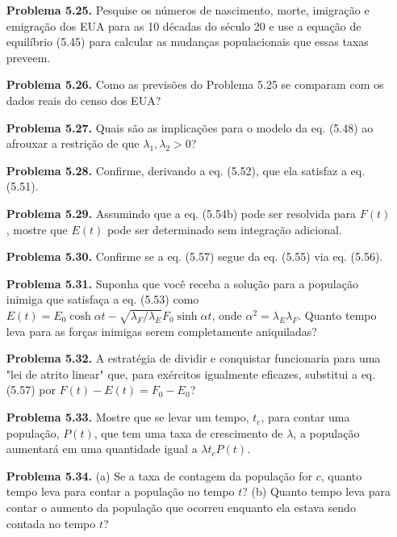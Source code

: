 \begin{enumerate}
    \item[\textbf{Problema 5.25.}] Pesquise os números de nascimento, morte, imigração e emigração dos EUA para as 10 décadas do século 20 e use a equação de equilíbrio (5.45) para calcular as mudanças populacionais que essas taxas preveem.

    \item[\textbf{Problema 5.26.}] Como as previsões do Problema 5.25 se comparam com os dados reais do censo dos EUA?

    \item[\textbf{Problema 5.27.}] Quais são as implicações para o modelo da eq. (5.48) ao afrouxar a restrição de que $\lambda_1, \lambda_2 > 0$?

    \item[\textbf{Problema 5.28.}] Confirme, derivando a eq. (5.52), que ela satisfaz a eq. (5.51).

    \item[\textbf{Problema 5.29.}] Assumindo que a eq. (5.54b) pode ser resolvida para $F(t)$, mostre que $E(t)$ pode ser determinado sem integração adicional.

    \item[\textbf{Problema 5.30.}] Confirme se a eq. (5.57) segue da eq. (5.55) via eq. (5.56).

    \item[\textbf{Problema 5.31.}] Suponha que você receba a solução para a população inimiga que satisfaça a eq. (5.53) como $E(t) = E_0 \cosh \alpha t - \sqrt{\lambda_F / \lambda_E} F_0 \sinh \alpha t$, onde $\alpha^2 = \lambda_E \lambda_F$. Quanto tempo leva para as forças inimigas serem completamente aniquiladas?

    \item[\textbf{Problema 5.32.}] A estratégia de dividir e conquistar funcionaria para uma "lei de atrito linear" que, para exércitos igualmente eficazes, substitui a eq. (5.57) por $F(t) - E(t) = F_0 - E_0$?

    \item[\textbf{Problema 5.33.}] Mostre que se levar um tempo, $t_c$, para contar uma população, $P(t)$, que tem uma taxa de crescimento de $\lambda$, a população aumentará em uma quantidade igual a $\lambda t_c P(t)$.

    \item[\textbf{Problema 5.34.}] (a) Se a taxa de contagem da população for $c$, quanto tempo leva para contar a população no tempo $t$? (b) Quanto tempo leva para contar o aumento da população que ocorreu enquanto ela estava sendo contada no tempo $t$?


\end{enumerate}
